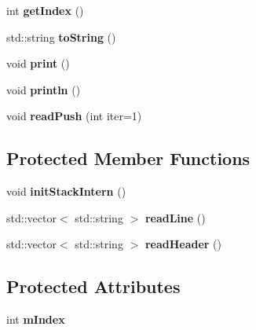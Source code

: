 \begin{DoxyCompactItemize}
\item 
int {\bfseries get\+Index} ()\hypertarget{class_problem_a09511acd5bec03c7a75bf58d19645a98}{}\label{class_problem_a09511acd5bec03c7a75bf58d19645a98}

\item 
std\+::string {\bfseries to\+String} ()\hypertarget{class_problem_a0557ccf99dec38574270a6385ece70d0}{}\label{class_problem_a0557ccf99dec38574270a6385ece70d0}

\item 
void {\bfseries print} ()\hypertarget{class_problem_a3bbf44cb316faa44afdc351ebdac6a4c}{}\label{class_problem_a3bbf44cb316faa44afdc351ebdac6a4c}

\item 
void {\bfseries println} ()\hypertarget{class_problem_acb9ad1df46781fd0ccfd7aae4c0cbbfa}{}\label{class_problem_acb9ad1df46781fd0ccfd7aae4c0cbbfa}

\item 
void {\bfseries read\+Push} (int iter=1)\hypertarget{class_problem_a7fcfe23395fd9ff931f502a2d7fc7499}{}\label{class_problem_a7fcfe23395fd9ff931f502a2d7fc7499}

\end{DoxyCompactItemize}
\subsection*{Protected Member Functions}
\begin{DoxyCompactItemize}
\item 
void {\bfseries init\+Stack\+Intern} ()\hypertarget{class_problem_a784152fad7b879e224304e666194bc5f}{}\label{class_problem_a784152fad7b879e224304e666194bc5f}

\item 
std\+::vector$<$ std\+::string $>$ {\bfseries read\+Line} ()\hypertarget{class_problem_a8b50749a706399126db45715cdfcd9d9}{}\label{class_problem_a8b50749a706399126db45715cdfcd9d9}

\item 
std\+::vector$<$ std\+::string $>$ {\bfseries read\+Header} ()\hypertarget{class_problem_ab8ccb9161ac36c786522b572a2d70e30}{}\label{class_problem_ab8ccb9161ac36c786522b572a2d70e30}

\end{DoxyCompactItemize}
\subsection*{Protected Attributes}
\begin{DoxyCompactItemize}
\item 
int {\bfseries m\+Index}\hypertarget{class_problem_a3a5c4dbc0ecdff910fe3faf8d78245c6}{}\label{class_problem_a3a5c4dbc0ecdff910fe3faf8d78245c6}

\end{DoxyCompactItemize}
